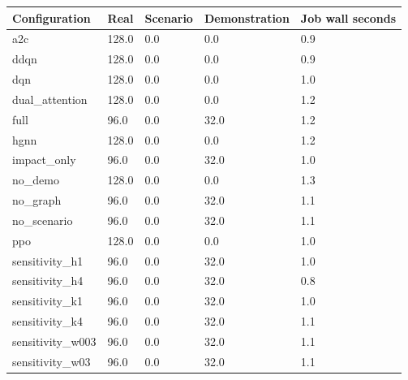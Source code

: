 \begin{tabular}{lllll}
\toprule
Configuration & Real & Scenario & Demonstration & Job wall seconds\\
\midrule
a2c & 128.0 & 0.0 & 0.0 & 0.9\\
ddqn & 128.0 & 0.0 & 0.0 & 0.9\\
dqn & 128.0 & 0.0 & 0.0 & 1.0\\
dual\_attention & 128.0 & 0.0 & 0.0 & 1.2\\
full & 96.0 & 0.0 & 32.0 & 1.2\\
hgnn & 128.0 & 0.0 & 0.0 & 1.2\\
impact\_only & 96.0 & 0.0 & 32.0 & 1.0\\
no\_demo & 128.0 & 0.0 & 0.0 & 1.3\\
no\_graph & 96.0 & 0.0 & 32.0 & 1.1\\
no\_scenario & 96.0 & 0.0 & 32.0 & 1.1\\
ppo & 128.0 & 0.0 & 0.0 & 1.0\\
sensitivity\_h1 & 96.0 & 0.0 & 32.0 & 1.0\\
sensitivity\_h4 & 96.0 & 0.0 & 32.0 & 0.8\\
sensitivity\_k1 & 96.0 & 0.0 & 32.0 & 1.0\\
sensitivity\_k4 & 96.0 & 0.0 & 32.0 & 1.1\\
sensitivity\_w003 & 96.0 & 0.0 & 32.0 & 1.1\\
sensitivity\_w03 & 96.0 & 0.0 & 32.0 & 1.1\\
\bottomrule
\end{tabular}